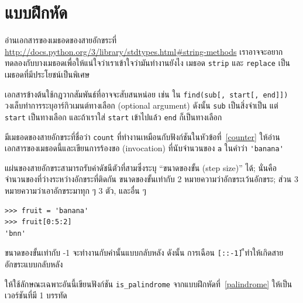 \section{แบบฝึกหัด}

\begin{exercise}

อ่านเอกสารของเมธอดของสายอักขระที่ 
\url{http://docs.python.org/3/library/stdtypes.html#string-methods}
เราอาจจะอยากทดลองกับบางเมธอดเพื่อให้แน่ใจว่าเราเข้าใจว่ามันทำงานยังไง
เมธอด {\tt strip} และ {\tt replace} เป็นเมธอดที่มีประโยชน์เป็นพิเศษ 

เอกสารข้างต้นใช้กฎวากสัมพันธ์ที่อาจจะสับสนหน่อย เช่น ใน \verb"find(sub[, start[, end]])"
วงเล็บทำการระบุอาร์กิวเมนต์ทางเลือก (optional argument) ดังนั้น {\tt sub} 
เป็นสิ่งจำเป็น แต่ {\tt start} เป็นทางเลือก และถ้าเราใส่ {\tt start} เข้าไปแล้ว 
{\tt end} ก็เป็นทางเลือก

\end{exercise}


\begin{exercise}

มีเมธอดของสายอักขระที่ชื่อว่า {\tt count} ที่ทำงานเหมือนกับฟังก์ชันในหัวข้อที่~\ref{counter}
ให้อ่านเอกสารของเมธอดนี้และเขียนการร้องขอ (invocation) ที่นับจำนวนของ {\tt a}
ในคำว่า \verb"'banana'"
\end{exercise}


\begin{exercise}

แผ่นของสายอักขระสามารถรับค่าดัชนีตัวที่สามซึ่งระบุ ``ขนาดของขั้น (step size)'' ได้; นั่นคือ 
จำนวนของที่ว่างระหว่างอักขระที่ติดกัน ขนาดของขั้นเท่ากับ 2 หมายความว่าอักขระเว้นอักขระ;
ส่วน 3 หมายความว่าเอาอักขระมาทุก ๆ 3 ตัว, และอื่น ๆ

\begin{verbatim}
>>> fruit = 'banana'
>>> fruit[0:5:2]
'bnn'
\end{verbatim}

ขนาดของขั้นเท่ากับ -1 จะทำงานกับคำนั้นแบบกลับหลัง ดังนั้น การเฉือน \verb"[::-1]"
ืทำให้เกิดสายอักขระแบบกลับหลัง

ให้ใช้ลักษณะเฉพาะอันนี้เขียนฟังก์ชัน \verb"is_palindrome" จากแบบฝึกหัดที่~\ref{palindrome} 
ให้เป็นเวอร์ชันที่มี 1 บรรทัด
\end{exercise}


